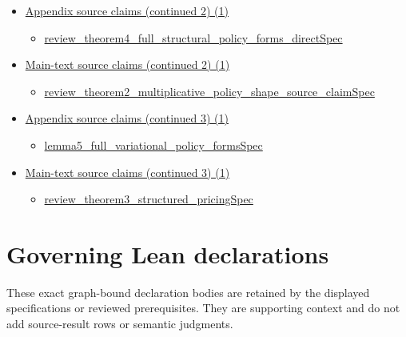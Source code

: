 \documentclass[10pt]{article}
\begin{document}
\begin{itemize}[leftmargin=1.2em]
\begin{itemize}[leftmargin=1.2em]
\item \hyperlink{source-claim-38fbb9f78eb2c2c7}{review\_\allowbreak{}theorem2\_\allowbreak{}multiplicative\_\allowbreak{}positive\_\allowbreak{}finite\_\allowbreak{}cutoff\_\allowbreak{}not\_\allowbreak{}ic\_\allowbreak{}both\_\allowbreak{}states\allowbreak{}Spec}
\end{itemize}
\item \hyperlink{source-section-e0bf42a2f186588f}{Appendix source claims (continued 2) (1)}
\begin{itemize}[leftmargin=1.2em]
\item \hyperlink{source-claim-d0eae55048459432}{review\_\allowbreak{}theorem4\_\allowbreak{}full\_\allowbreak{}structural\_\allowbreak{}policy\_\allowbreak{}forms\_\allowbreak{}direct\allowbreak{}Spec}
\end{itemize}
\item \hyperlink{source-section-62736bb95a656bbc}{Main-text source claims (continued 2) (1)}
\begin{itemize}[leftmargin=1.2em]
\item \hyperlink{source-claim-e4ff38b469e6cc30}{review\_\allowbreak{}theorem2\_\allowbreak{}multiplicative\_\allowbreak{}policy\_\allowbreak{}shape\_\allowbreak{}source\_\allowbreak{}claim\allowbreak{}Spec}
\end{itemize}
\item \hyperlink{source-section-13054b3f2d04f1de}{Appendix source claims (continued 3) (1)}
\begin{itemize}[leftmargin=1.2em]
\item \hyperlink{source-claim-5a2021856d51c6f7}{lemma5\_\allowbreak{}full\_\allowbreak{}variational\_\allowbreak{}policy\_\allowbreak{}forms\allowbreak{}Spec}
\end{itemize}
\item \hyperlink{source-section-6c491f2461bc0518}{Main-text source claims (continued 3) (1)}
\begin{itemize}[leftmargin=1.2em]
\item \hyperlink{source-claim-f1c3806503822cde}{review\_\allowbreak{}theorem3\_\allowbreak{}structured\_\allowbreak{}pricing\allowbreak{}Spec}
\end{itemize}
\end{itemize}

\clearpage
\hypertarget{governing-declaration-section-5ef5ef0364b6939c}{}
\section*{Governing Lean declarations}
These exact graph-bound declaration bodies are retained by the displayed specifications or reviewed prerequisites. They are supporting context and do not add source-result rows or semantic judgments.
\hypertarget{governing-declaration-8abf7317ed439b5d}{}
\end{document}
